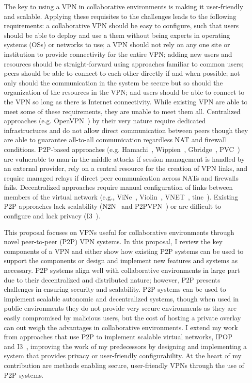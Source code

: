 The key to using a VPN in collaborative environments is making it user-friendly
and scalable.  Applying these requisites to the challenges leads to the
following requirements:  a collaborative VPN should be easy to configure, such
that users should be able to deploy and use a them without being experts in
operating systems (OSs) or networks to use; a VPN should not rely on any one
site or institution to provide connectivity for the entire VPN; adding new
users and resources should be straight-forward using approaches familiar to
common users; peers should be able to connect to each other directly if and
when possible; not only should the communication in the system be secure but so
should the organization of the resources in the VPN; and users should be able
to connect to the VPN so long as there is Internet connectivity.  While
existing VPN are able to meet some of these requirements, they are unable to
meet them all.  Centralized approaches (e.g.  OpenVPN~\cite{openvpn}) by their
very nature require dedicated infrastructures and do not allow direct
communication between peers though they are able to guarantee all-to-all
communication regardless NAT and firewall conditions.  P2P-based approaches
(e.g. Hamachi~\cite{hamachi}, Wippien~\cite{wippien}, Gbridge~\cite{gbridge},
PVC~\cite{pvc}) are vulnerable to man-in-the-middle attacks if session
management is handled by an external provider, rely on a central resource for
the creation of VPN links, and require managed relays if direct peer
communication across NATs and firewalls fails.  Decentralized approaches
require manual configuration of links between members of the virtual network
(e.g., ViNe~\cite{vine}, Violin~\cite{violin}, VNET~\cite{vnet},
tinc~\cite{tinc}).  Existing P2P approaches lack scalability (N2N~\cite{n2n}
and P2PVPN~\cite{p2pvpn}) or are difficult to configure and lack privacy
(I3~\cite{i3}).

This proposal focuses on VPNs useful for collaborative environments through
novel peer-to-peer (P2P) VPN systems.  In this proposal, I review the key
components of a VPN and either show how existing P2P systems can be used to
support the components or design and implement new features and systems as
necessary.  P2P systems align well with collaborative environments in large
part due to their decentralized and distributed nature; however, P2P presents
challenges in ensuring security and scalability.  P2P systems can be used
to implement scalable autonomic and decentralized systems, though when used
in public environments they do not provide very secure environments as they
are easily compromised by malicious users, but the cost of hosting a private
overlay can out weigh the advantages in collaborative environments.  I extend
my work from approaches that use P2P to implement scalable virtual networks,
IPOP~\cite{ipop} and I3~\cite{i3}, improving the work of my predecessors by
designing and implementing a system that provides privacy or user-friendly
configurability.  At the heart of my contribution are methods enabling secure,
user-friendly VPNs through the use of P2P systems.

